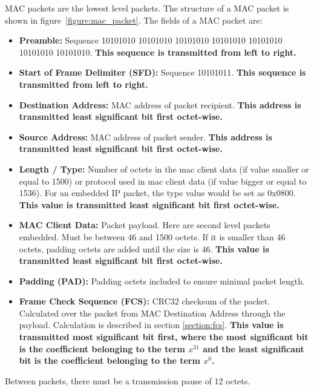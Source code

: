 MAC packets are the lowest level packets. The structure of a MAC packet is shown in figure~\ref{figure:mac_packet}. The fields of a MAC packet are:
\begin{itemize}
  \item \textbf{Preamble:} Sequence 10101010 10101010 10101010 10101010 10101010 10101010 10101010. \textbf{This sequence is transmitted from left to right.}
  \item \textbf{Start of Frame Delimiter (SFD):} Sequence 10101011. \textbf{This sequence is transmitted from left to right.}
  \item \textbf{Destination Address:} MAC address of packet recipient. \textbf{This address is transmitted least significant bit first octet-wise.}
  \item \textbf{Source Address:} MAC address of packet sender. \textbf{This address is transmitted least significant bit first octet-wise.}
  \item \textbf{Length / Type:} Number of octets in the mac client data (if value smaller or equal to 1500) or protocol used in mac client data (if value bigger or equal to 1536). For an embedded IP packet, the type value would be set as 0x0800. \textbf{This value is transmitted least significant bit first octet-wise.}
  \item \textbf{MAC Client Data:} Packet payload. Here are second level packets embedded. Must be between 46 and 1500 octets. If it is smaller than 46 octets, padding octets are added until the size is 46. \textbf{This value is transmitted least significant bit first octet-wise.}
  \item \textbf{Padding (PAD):} Padding octets included to ensure minimal packet length.
  \item \textbf{Frame Check Sequence (FCS):} CRC32 checksum of the packet. Calculated over the packet from MAC Destination Address through the payload. Calculation is described in section \ref{section:fcs}. \textbf{This value is transmitted most significant bit first, where the most significant bit is the coefficient belonging to the term \(x^{31}\) and the least significant bit is the coefficient belonging to the term \(x^0\).}
\end{itemize}

Between packets, there must be a transmission pause of 12 octets.

